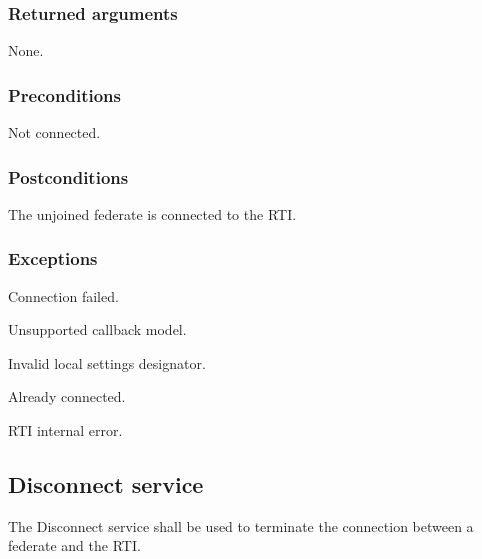 \begin{compactstdpage}
    \subsubsection{Returned arguments}

    \begin{stdalphalist}
        \item None.
    \end{stdalphalist}

    \subsubsection{Preconditions}

    \begin{stdalphalist}
        \item Not connected.
    \end{stdalphalist}

    \subsubsection{Postconditions}

    \begin{stdalphalist}
        \item The unjoined federate is connected to the RTI.
    \end{stdalphalist}

    \subsubsection{Exceptions}

    \begin{stdalphalist}
        \item Connection failed.
        \item Unsupported callback model.
        \item Invalid local settings designator.
        \item Already connected.
        \item RTI internal error.
    \end{stdalphalist}

    \subsection{Disconnect service}

    The Disconnect service shall be used to terminate the connection between a federate and the RTI.


\end{compactstdpage}
